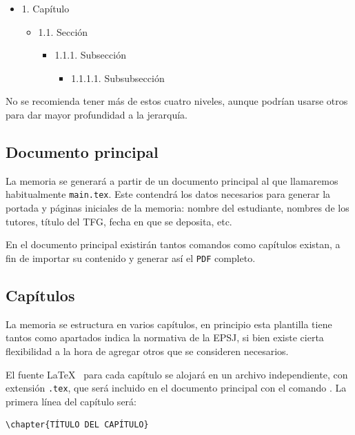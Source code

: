 \begin{itemize}
    \item 1. Capítulo
    \begin{itemize}
        \item 1.1. Sección
        \begin{itemize}
            \item 1.1.1. Subsección
            \begin{itemize}
                \item 1.1.1.1. Subsubsección
            \end{itemize}
        \end{itemize}
    \end{itemize}
\end{itemize}

No se recomienda tener más de estos cuatro niveles, aunque podrían usarse otros para dar mayor profundidad a la jerarquía.

\subsection{Documento principal}

La memoria se generará a partir de un documento principal al que llamaremos habitualmente \texttt{main.tex}. Este contendrá los datos necesarios para generar la portada y páginas iniciales de la memoria: nombre del estudiante, nombres de los tutores, título del TFG, fecha en que se deposita, etc.

En el documento principal existirán tantos comandos \verb*|| como capítulos existan, a fin de importar su contenido y generar así el \verb*|PDF| completo.

\subsection{Capítulos}\label{Sec.Capitulos}
La memoria se estructura en varios capítulos, en principio esta plantilla tiene tantos como apartados indica la normativa de la EPSJ, si bien existe cierta flexibilidad a la hora de agregar otros que se consideren necesarios.

El fuente \LaTeX~ para cada capítulo se alojará en un archivo independiente, con extensión \texttt{.tex}, que será incluido en el documento principal con el comando \verb*||. La primera línea del capítulo será:

\begin{verbatim}
\chapter{TÍTULO DEL CAPÍTULO}
\end{verbatim}

